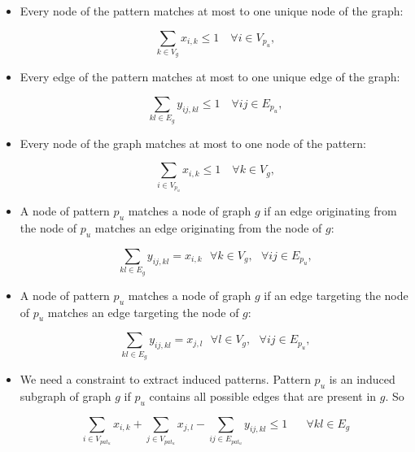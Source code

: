 \begin{itemize}
\item Every node of the pattern matches at most to one unique node of the graph:

\begin{equation}
\sum_{k\in V_g}x_{i,k} \leq 1 \quad \forall i\in V_{p_{u}},
\end{equation}

\item Every edge of the pattern matches at most to one unique edge of the graph:

\begin{equation}
\sum_{kl\in E_g}y_{ij,kl} \leq 1 \quad \forall ij\in E_{p_{u}},
\end{equation}

\item Every node of the graph matches at most to one node of the pattern:

\begin{equation}
\sum_{i\in V_{p_{u}}}x_{i,k} \leq 1 \quad \forall k\in V_g,
\end{equation}

\item A node of pattern $p_u$ matches a node of graph $g$ if an edge originating from the node of $p_u$ matches an edge originating from the node of $g$:

\begin{equation}
\sum_{kl \in E_g}y_{ij,kl} =  x_{i,k}\textit{  }\forall k \in V_g, \textit{  }\forall ij \in E_{p_{u}},
\end{equation}

\item A node of pattern $p_u$ matches a node of graph $g$ if an edge targeting the node of $p_u$ matches an edge targeting the node of $g$:

\begin{equation}
\sum_{kl \in E_g}y_{ij,kl} =  x_{j,l}\textit{  }\forall l \in V_g,\textit{  }\forall ij \in E_{p_{u}},
\end{equation}

\item We need a constraint to extract induced patterns. 
Pattern $p_{u}$ is an induced subgraph of graph $g$ if $p_{u}$ contains all possible edges that are present in $g$. 
So

\begin{equation}
\sum_{i \in V_{pat_{u}}}x_{i,k} + \sum_{j \in V_{pat_{u}}}x_{j,l} - \sum_{ij\in E_{pat_{u}}}y_{ij,kl} \leq 1
 \quad\textit{  }\forall kl\in E_g
\end{equation}
\end{itemize}

